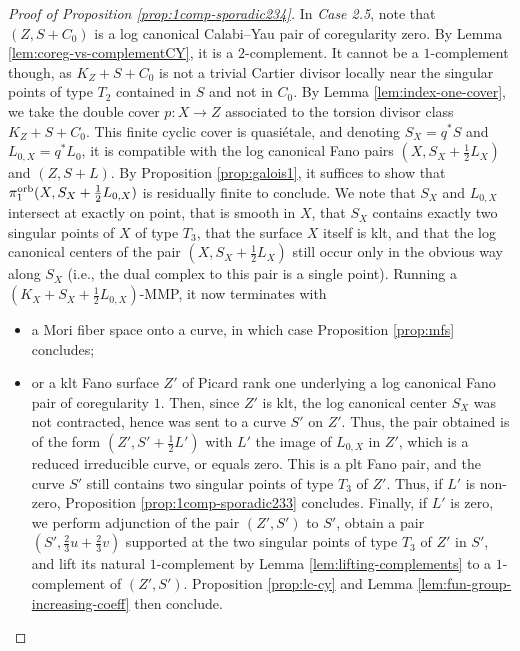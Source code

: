 \documentclass{amsart}
\theoremstyle{definition}
\theoremstyle{remark}
\numberwithin{equation}{section}
\begin{document}
\begin{proof}[Proof of Proposition \ref{prop:1comp-sporadic234}]
In {\it Case 2.5}, note that $(Z,S+C_0)$ is a log canonical Calabi--Yau pair of coregularity zero. By Lemma \ref{lem:coreg-vs-complementCY}, it is a $2$-complement. It cannot be a $1$-complement though, as $K_Z+S+C_0$ is not a trivial Cartier divisor locally near the singular points of type $T_2$ contained in $S$ and not in $C_0$.  By Lemma \ref{lem:index-one-cover}, we take the double cover $p:X\to Z$ associated to the torsion divisor class $K_Z+S+C_0$. This finite cyclic cover is quasi\'etale, and denoting $S_X=q^*S$ and $L_{0,X}=q^*L_0$, it is compatible with the log canonical Fano pairs $(X,S_X+\frac{1}{2}L_X)$ and $(Z,S+L)$. By Proposition \ref{prop:galois1}, it suffices to show that $\pi_1^{\rm orb}(X,S_X+\frac{1}{2}L_{0,X})$ is residually finite to conclude. We note that $S_X$ and $L_{0,X}$ intersect at exactly on point, that is smooth in $X$, that $S_X$ contains exactly two singular points of $X$ of type $T_3$, that the surface $X$ itself is klt, and that the log canonical centers of the pair $(X,S_X+\frac{1}{2}L_X)$ still occur only in the obvious way along $S_X$ (i.e., the dual complex to this pair is a single point). Running a $\left(K_X+S_X+\frac{1}{2}L_{0,X}\right)$-MMP, it now terminates with 
\begin{itemize}
    \item a Mori fiber space onto a curve, in which case Proposition \ref{prop:mfs} concludes;
    \item or a klt Fano surface $Z'$ of Picard rank one underlying a log canonical Fano pair of coregularity $1$. Then, since $Z'$ is klt, the log canonical center $S_X$ was not contracted, hence was sent to a curve $S'$ on $Z'$. Thus, the pair obtained is of the form $(Z',S'+\frac{1}{2}L')$ with $L'$ the image of $L_{0,X}$ in $Z'$, which is a reduced irreducible curve, or equals zero. This is a plt Fano pair, and the curve $S'$ still contains two singular points of type $T_3$ of $Z'$. Thus, if $L'$ is non-zero, Proposition \ref{prop:1comp-sporadic233} concludes. Finally, if $L'$ is zero, we perform adjunction of the pair $(Z',S')$ to $S'$, obtain a pair $(S',\frac{2}{3}u+\frac{2}{3}v)$ supported at the two singular points of type $T_3$ of $Z'$ in $S'$, and lift its natural $1$-complement by Lemma \ref{lem:lifting-complements} to a $1$-complement of $(Z',S')$. Proposition \ref{prop:lc-cy} and Lemma \ref{lem:fun-group-increasing-coeff} then conclude.
\end{itemize}

    
\end{proof}
\end{document}
